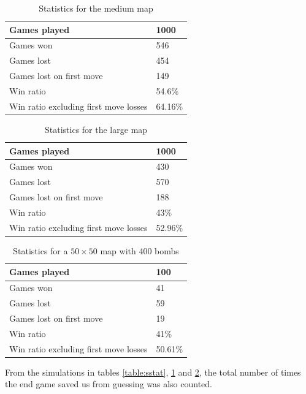 \documentclass[11pt,a4paper,notitlepage]{article}
\theoremstyle{definition}
\begin{document}
\begin{table}[H]
\begin{center}
\begin{tabular}{l|l}
Games played & 1000 \\
\hline
Games won & 546 \\
\hline
Games lost & 454 \\
\hline
Games lost on first move & 149 \\
\hline
Win ratio & 54.6\% \\
\hline
Win ratio excluding first move losses & 64.16\% \\
\end{tabular}
\end{center}
\caption{Statistics for the medium map}
\label{table:mstat}
\end{table}
\begin{table}[H]
\begin{center}
\begin{tabular}{l|l}
Games played & 1000 \\
\hline
Games won & 430 \\
\hline
Games lost & 570 \\
\hline
Games lost on first move & 188 \\
\hline
Win ratio & 43\% \\
\hline
Win ratio excluding first move losses & 52.96\% \\
\end{tabular}
\end{center}
\caption{Statistics for the large map}
\label{table:lstat}
\end{table}
\begin{table}[H]
\begin{center}
\begin{tabular}{l|l}
Games played & 100 \\
\hline
Games won & 41 \\
\hline
Games lost & 59 \\
\hline
Games lost on first move & 19 \\
\hline
Win ratio & 41\% \\
\hline
Win ratio excluding first move losses & 50.61\% \\
\end{tabular}
\end{center}
\caption{Statistics for a $50 \times 50$ map with 400 bombs}
\label{table:cstat}
\end{table}

From the simulations in tables \ref{table:sstat}, \ref{table:mstat} and \ref{table:lstat}, the total number of times the end game saved us from guessing was also counted.
\end{document}
